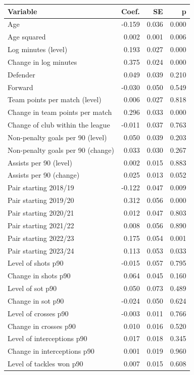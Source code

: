 \begin{tabular}{lrrr}
\toprule
Variable & Coef. & SE & p \\
\midrule
Age & -0.159 & 0.036 & 0.000 \\
Age squared & 0.002 & 0.001 & 0.006 \\
Log minutes (level) & 0.193 & 0.027 & 0.000 \\
Change in log minutes & 0.375 & 0.024 & 0.000 \\
Defender & 0.049 & 0.039 & 0.210 \\
Forward & -0.030 & 0.050 & 0.549 \\
Team points per match (level) & 0.006 & 0.027 & 0.818 \\
Change in team points per match & 0.296 & 0.033 & 0.000 \\
Change of club within the league & -0.011 & 0.037 & 0.763 \\
Non-penalty goals per 90 (level) & 0.050 & 0.039 & 0.203 \\
Non-penalty goals per 90 (change) & 0.033 & 0.030 & 0.267 \\
Assists per 90 (level) & 0.002 & 0.015 & 0.883 \\
Assists per 90 (change) & 0.025 & 0.013 & 0.052 \\
Pair starting 2018/19 & -0.122 & 0.047 & 0.009 \\
Pair starting 2019/20 & 0.312 & 0.056 & 0.000 \\
Pair starting 2020/21 & 0.012 & 0.047 & 0.803 \\
Pair starting 2021/22 & 0.008 & 0.056 & 0.890 \\
Pair starting 2022/23 & 0.175 & 0.054 & 0.001 \\
Pair starting 2023/24 & 0.113 & 0.053 & 0.033 \\
Level of shots p90 & -0.015 & 0.057 & 0.795 \\
Change in shots p90 & 0.064 & 0.045 & 0.160 \\
Level of sot p90 & 0.050 & 0.073 & 0.489 \\
Change in sot p90 & -0.024 & 0.050 & 0.624 \\
Level of crosses p90 & -0.003 & 0.011 & 0.766 \\
Change in crosses p90 & 0.010 & 0.016 & 0.520 \\
Level of interceptions p90 & 0.017 & 0.018 & 0.345 \\
Change in interceptions p90 & 0.001 & 0.019 & 0.960 \\
Level of tackles won p90 & 0.007 & 0.015 & 0.608 \\

\end{tabular}
